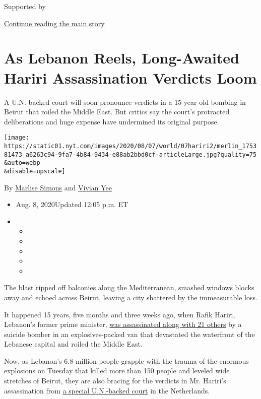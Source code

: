 Supported by

\protect\hyperlink{after-sponsor}{Continue reading the main story}

\hypertarget{as-lebanon-reels-long-awaited-hariri-assassination-verdicts-loom}{%
\section{As Lebanon Reels, Long-Awaited Hariri Assassination Verdicts
Loom}\label{as-lebanon-reels-long-awaited-hariri-assassination-verdicts-loom}}

A U.N.-backed court will soon pronounce verdicts in a 15-year-old
bombing in Beirut that roiled the Middle East. But critics say the
court's protracted deliberations and huge expense have undermined its
original purpose.

\texttt{[image: https://static01.nyt.com/images/2020/08/07/world/07hariri2/merlin\_175381473\_a6263c94-9fa7-4b84-9434-e88ab2bbd0cf-articleLarge.jpg?quality=75\\\&auto=webp\\\&disable=upscale]}

By \href{https://www.nytimes.com/by/marlise-simons}{Marlise Simons} and
\href{https://www.nytimes.com/by/vivian-yee}{Vivian Yee}

\begin{itemize}
\item
  Aug. 8, 2020Updated 12:05 p.m. ET
\item
  \begin{itemize}
  \item
  \item
  \item
  \item
  \item
  \end{itemize}
\end{itemize}

The blast ripped off balconies along the Mediterranean, smashed windows
blocks away and echoed across Beirut, leaving a city shattered by the
immeasurable loss.

It happened 15 years, five months and three weeks ago, when Rafik
Hariri, Lebanon's former prime minister,
\href{https://www.nytimes.com/2005/02/14/world/africa/former-prime-minister-rafik-hariri-killed-in-explosion.html}{was
assassinated along with 21 others} by a suicide bomber in an
explosives-packed van that devastated the waterfront of the Lebanese
capital and roiled the Middle East.

Now, as Lebanon's 6.8 million people grapple with the trauma of the
enormous explosions on Tuesday that killed more than 150 people and
leveled wide stretches of Beirut, they are also bracing for the verdicts
in Mr. Hariri's assassination from \href{https://www.stl-tsl.org/en}{a
special U.N.-backed court} in the Netherlands.

